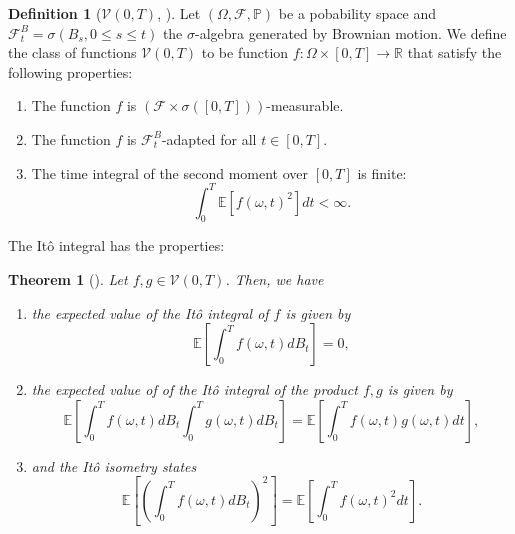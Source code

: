 \documentclass[12pt]{article}
\newtheorem{theorem}{Theorem}[section]
\theoremstyle{definition}
\newtheorem{definition}[definition]{Definition}
\numberwithin{equation}{section}
\newcommand{\R}{\mathbb{R}}
\newcommand{\BP}{\mathbb{P}}
\newcommand{\CF}{\mathcal{F}}
\newcommand{\CV}{\mathcal{V}}
\newcommand{\ev}[1]{\mathbb{E}\left[{#1}\right]}
\begin{document}
\begin{definition}[$\CV(0,T)$, ]
  Let $(\Omega, \CF, \BP)$ be a pobability space and $\CF_t^B = \sigma(B_s, 0 \leq s \leq t)$ the $\sigma$-algebra generated by Brownian motion. We define the class of functions $\CV(0,T)$ to be function $f :\Omega \times [0,T] \rightarrow \R$ that satisfy the following properties:
  \begin{enumerate}[label=(\roman*)]
    \item The function $f$ is $(\CF \times \sigma([0,T]))$-measurable.
    \item The function $f$ is $\CF_t^B$-adapted for all $t \in [0,T]$.
    \item The time integral of the second moment over $[0,T]$ is finite:
    \begin{equation*}
      \int_0^T \ev{f(\omega,t)^2}dt< \infty.
    \end{equation*}
  \end{enumerate}
\end{definition}
The Itô integral has the properties:
\begin{theorem}[\autocite{eAppliedStochasticAnalysis2021}]
  \label{thm:ito_isometry}
  Let $f,g \in \CV(0,T)$. Then, we have
  \begin{enumerate}[label=(\roman*)]
    \item \label{item:zero_integral} the expected value of the Itô integral of $f$ is given by
    \begin{equation}
    \label{eq:ito_integral_ev}
    \ev{\int_0^T f(\omega,t)dB_t} = 0,
    \end{equation}
    \item the expected value of of the Itô integral of the product $f,g$ is given by
    \begin{equation}
      \label{eq:ito_product}
      \ev{\int_0^T f(\omega,t)dB_t\int_0^T g(\omega,t)dB_t } = \ev{\int_0^T f(\omega,t)g(\omega, t)dt },
    \end{equation}
    \item and the Itô isometry states
    \begin{equation}
      \label{eq:ito_isometry}
      \ev{\left(\int_0^T f(\omega,t)dB_t\right)^2 } = \ev{\int_0^T f(\omega,t)^2dt }.
    \end{equation}
  \end{enumerate}
\end{theorem}
\end{document}

